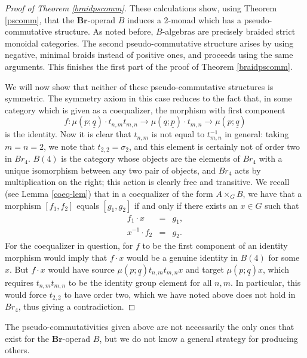 \documentclass{amsbook} %
\newcommand{\mb}{\mathbf}
\numberwithin{section}{chapter}
\begin{document}
\begin{proof}[Proof of Theorem \ref{braidpscomm}]
These calculations show, using Theorem \ref{pscomm}, that the $\mb{Br}$-operad $B$ induces a 2-monad which has a pseudo-commutative structure.  As noted before, $B$-algebras are precisely braided strict monoidal categories.  The second pseudo-commutative structure arises by using negative, minimal braids instead of positive ones, and proceeds using the same arguments.  This finishes the first part of the proof of Theorem \ref{braidpscomm}.

We will now show that neither of these pseudo-commutative structures is symmetric.  The symmetry axiom in this case reduces to the fact that, in some category which is given as a coequalizer, the morphism with first component
\[
f:\mu(p; \underline{q}) \cdot t_{n,m}t_{m,n} \rightarrow \mu(q; \underline{p}) \cdot t_{m,n} \rightarrow \mu(p; \underline{q})
\]
is the identity.  Now it is clear that $t_{n,m}$ is not equal to $t_{m,n}^{-1}$ in general: taking $m=n=2$, we note that $t_{2,2} = \sigma_{2}$, and this element is certainly not of order two in $Br_{4}$.  $B(4)$ is the category whose objects are the elements of $Br_{4}$ with a unique isomorphism between any two pair of objects, and $Br_{4}$ acts by multiplication on the right; this action is clearly free and transitive.  We recall (see Lemma \ref{coeq-lem}) that in a coequalizer of the form $A \times_{G} B$, we have that a morphism $[f_{1}, f_{2}]$ equals $[g_{1}, g_{2}]$ if and only if there exists an $x \in G$ such that
\[
\begin{array}{rcl}
f_{1} \cdot x & = & g_{1}, \\
x^{-1} \cdot f_{2} & = & g_{2}.
\end{array}
\]
For the coequalizer in question, for $f$ to be the first component of an identity morphism would imply that $f \cdot x$ would be a genuine identity in $B(4)$ for some $x$.  But $f \cdot x$ would have source $\mu(p; \underline{q}) t_{n,m}t_{m,n}x$ and target $\mu(p; \underline{q})x$, which requires $t_{n,m}t_{m,n}$ to be the identity group element for all $n,m$.  In particular, this would force $t_{2,2}$ to have order two, which we have noted above does not hold in $Br_{4}$, thus giving a contradiction.
\end{proof}

\begin{rem}
The pseudo-commutativities given above are not necessarily the only ones that exist for the $\mb{Br}$-operad $B$, but we do not know a general strategy for producing others.
\end{rem}
\end{document}
